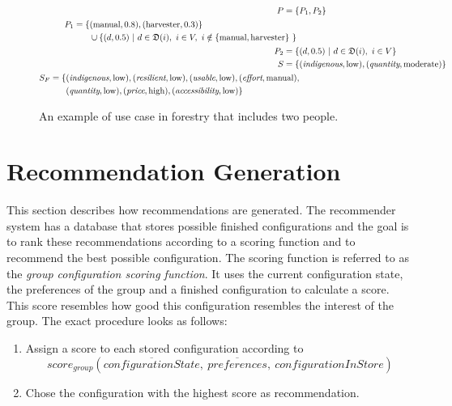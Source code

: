 \begin{figure}
\begin{mdframed}[frametitle={Example for Forestry Use Case}, linecolor=black, frametitlerulecolor=black, frametitlebackgroundcolor=gray!5]
\begin{align}
            P = \{ & P_1, P_2\} \notag\\
            \begin{split}
                P_1 = \{ & (\text{manual}, 0.8), (\text{harvester}, 0.3) \} \\ 
                & \cup \{ (d,0.5)\ |\ d \in \mathfrak{D}(i),\ i \in V,\ i \notin \{ \text{manual}, \text{harvester}\} \ \} \ 
            \end{split} \notag \\
            P_2 = \{ & (d,0.5)\ |\ d \in \mathfrak{D}(i),\ i \in V \} \notag \\
            S  =  \{ & (\textit{indigenous}, \text{low}), (\textit{quantity}, \text{moderate}) \} \notag \\
            \begin{split}
            S_F  =  \{ & (\textit{indigenous}, \text{low}), (\textit{resilient}, \text{low}), (\textit{usable},\text{low}), (\textit{effort}, \text{manual}), \\
            & (\textit{quantity}, \text{low}), (\textit{price},\text{high}),(\textit{accessibility}, \text{low}) \} 
            \end{split} \notag
        \end{align}
    \end{mdframed}
    \caption{An example of use case in forestry that includes two people.}
    \label{fig:Concept:ForestExample}
\end{figure}


\section{Recommendation Generation}
\label{sec:Concept:SolutionGeneration}

This section describes how recommendations are generated. The recommender system has a database that stores possible finished configurations and the goal is to rank these recommendations according to a scoring function and to recommend the best possible configuration. The scoring function is referred to as the \emph{group configuration scoring function}. It uses the current configuration state, the preferences of the group and a finished configuration to calculate a score. This score resembles how good this configuration resembles the interest of the group. The exact procedure looks as follows:

\begin{enumerate}
    \item Assign a score to each stored configuration according to $$score_{group}(\overline{configurationState},\ \overline{preferences}, \ configurationInStore)$$
    \item Chose the configuration with the highest score as recommendation.
\end{enumerate}

